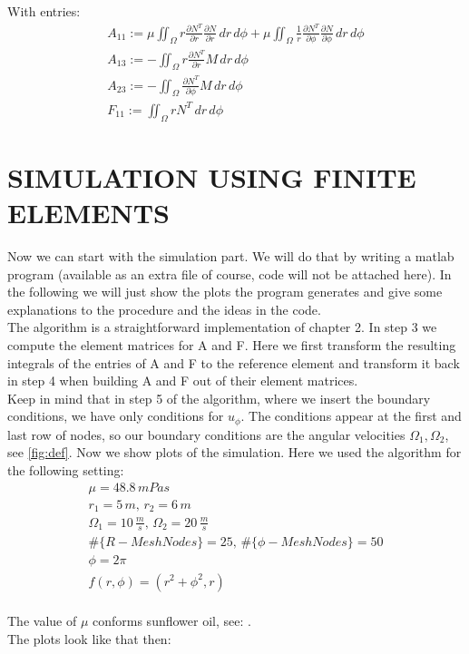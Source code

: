 \documentclass[12pt,a4paper]{report}
\begin{document}
With entries:
\begin{equation}
\begin{array}{l}
    A_{11} := \mu \iint_{\Omega}r \frac{\partial N^T}{\partial r}\frac{\partial N}{\partial r} \, dr\,d\phi + \mu \iint_{\Omega} \frac{1}{r} \frac{\partial N^T}{\partial \phi} \frac{\partial N}{\partial \phi} \, dr\,d\phi\\
    A_{13} := - \iint_{\Omega} r \frac{\partial N^T}{\partial r}M\, dr\,d\phi\\
    A_{23} := - \iint_{\Omega} \frac{\partial N^T}{\partial \phi}M\, dr\,d\phi\\
    F_{11} := \iint_{\Omega} rN^T \, dr\,d\phi
\end{array}
\end{equation}
\chapter{SIMULATION USING FINITE ELEMENTS}
Now we can start with the simulation part. We will do that by writing a matlab program (available as an extra file of course, code will not be attached here). In the following we will just show the plots the program generates and give some explanations to the procedure and the ideas in the code.\\

The algorithm is a straightforward implementation of chapter 2. In step 3 we compute the element matrices for A and F. Here we first transform the resulting integrals of the entries of A and F to the reference element and transform it back in step 4 when building A and F out of their element matrices.\\
Keep in mind that in step 5 of the algorithm, where we insert the boundary conditions, we have only conditions for \(u_{\phi}\). The conditions appear at the first and last row of nodes, so our boundary conditions are the angular velocities \(\Omega_1, \Omega_2\), see \ref{fig:def}.
\newpage
Now we show plots of the simulation. Here we used the algorithm for the following setting:
\begin{equation}
    \begin{array}{l}
         \mu = 48.8 \,mPas\\
         r_1 = 5 \, m, \, r_2 = 6 \, m\\
         \Omega_1 = 10 \, \frac{m}{s}, \, \Omega_2 = 20 \, \frac{m}{s}\\
         \#\{R-MeshNodes\} = 25, \, \#\{\phi-MeshNodes\} = 50\\
         \phi = 2\pi\\
         f(r,\phi) = (r^2+\phi ^2,r)
    \end{array}
\end{equation}\\
The value of \(\mu\) conforms sunflower oil, see: \cite{visc}.\\
The plots look like that then:\\
\end{document}
